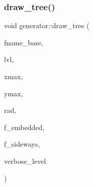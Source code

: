 \mbox{\label{classgenerator_ae3d68e3de8f4a5decdaef2d8008cd4a6}} 
\subsubsection{\texorpdfstring{draw\+\_\+tree()}{draw\_tree()}}
{\footnotesize\ttfamily void generator\+::draw\+\_\+tree (\begin{DoxyParamCaption}\item[{\mbox{\hyperlink{galois_8h_ab6cc7b4aeb6ea31aba2b3fbfc83ff5e6}{B\+Y\+TE}} $\ast$}]{fname\+\_\+base,  }\item[{\mbox{\hyperlink{galois_8h_a09fddde158a3a20bd2dcadb609de11dc}{I\+NT}}}]{lvl,  }\item[{\mbox{\hyperlink{galois_8h_a09fddde158a3a20bd2dcadb609de11dc}{I\+NT}}}]{xmax,  }\item[{\mbox{\hyperlink{galois_8h_a09fddde158a3a20bd2dcadb609de11dc}{I\+NT}}}]{ymax,  }\item[{\mbox{\hyperlink{galois_8h_a09fddde158a3a20bd2dcadb609de11dc}{I\+NT}}}]{rad,  }\item[{\mbox{\hyperlink{galois_8h_a09fddde158a3a20bd2dcadb609de11dc}{I\+NT}}}]{f\+\_\+embedded,  }\item[{\mbox{\hyperlink{galois_8h_a09fddde158a3a20bd2dcadb609de11dc}{I\+NT}}}]{f\+\_\+sideways,  }\item[{\mbox{\hyperlink{galois_8h_a09fddde158a3a20bd2dcadb609de11dc}{I\+NT}}}]{verbose\+\_\+level }\end{DoxyParamCaption})}

\mbox{\label{classgenerator_a7ec4c0902ecfc19049792b60526ae446}} 
